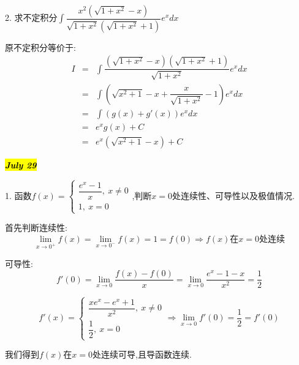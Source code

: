 2. 求不定积分$\int\dfrac{x^2(\sqrt{1+x^2}-x)}{\sqrt{1+x^2}(\sqrt{1+x^2}+1)}e^{x}dx$
\begin{solution}
	
	原不定积分等价于: 
	\begin{eqnarray*}
		I&=&\int\dfrac{(\sqrt{1+x^2}-x)(\sqrt{1+x^2}+1)}{\sqrt{1+x^2}}e^xdx\\
		&=&\int(\sqrt{x^2+1}-x+\dfrac{x}{\sqrt{1+x^2}}-1)e^xdx\\
		&=&\int(g(x)+g'(x))e^xdx\\
		&=&e^xg(x)+C\\
		&=&e^x(\sqrt{x^2+1}-x)+C
	\end{eqnarray*}
\end{solution}

\hl{\textbf{\textit{July 29}}}

1. 函数$f(x)=\left\lbrace
\begin{array}{l}
	\dfrac{e^x-1}{x},\ x\neq 0\\
	1,\ x=0
\end{array}
\right. $,判断$x=0$处连续性、可导性以及极值情况.
\begin{solution}
	
	首先判断连续性: $$\lim\limits_{x\rightarrow 0^{+}}f(x)=\lim\limits_{x\rightarrow 0^{-}}f(x)=1=f(0)\Rightarrow f(x)\text{在}x=0\text{处连续}$$
	
	可导性: 
	$$f'(0)=\lim\limits_{x\rightarrow 0}\dfrac{f(x)-f(0)}{x}=\lim\limits_{x\rightarrow 0}\dfrac{e^x-1-x}{x^2}=\dfrac{1}{2}$$
	
	$$f'(x)=\left\lbrace
	\begin{array}{l}
		\dfrac{xe^x-e^x+1}{x^2},\ x\neq 0\\
		\dfrac{1}{2},\ x=0
	\end{array}
	\right. \Rightarrow \lim\limits_{x\rightarrow 0}f'(0)=\dfrac{1}{2}=f'(0)$$
	
	我们得到$f(x)$在$x=0$处连续可导,且导函数连续.
\end{solution}

